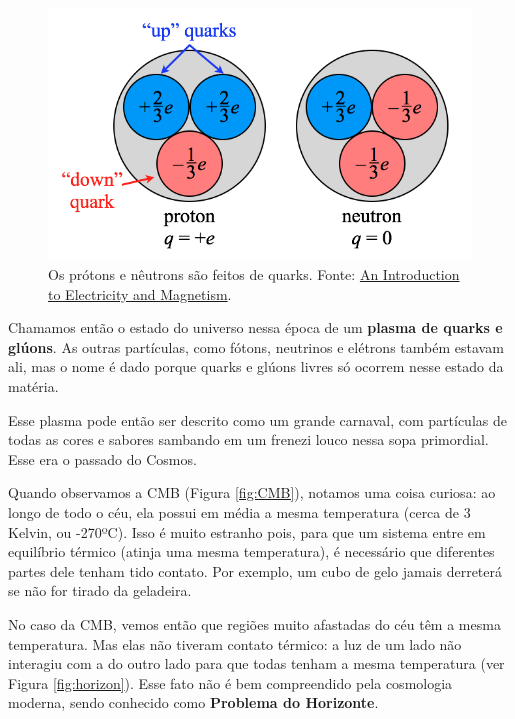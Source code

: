 \begin{multicols}{2}
\begin{figure}[H]
	\centering
	\includegraphics[width=\linewidth]{Figuras/Artigo1/quarks.png}
	\caption{Os prótons e nêutrons são feitos de quarks. Fonte: \href{https://5-volts.blogspot.com/2016/06/carga-eletrica.html}{An Introduction to Electricity and Magnetism}.}
	\label{fig:quarks}
\end{figure}

Chamamos então o estado do universo nessa época de um \textbf{plasma de quarks e glúons}. As outras partículas, como fótons, neutrinos e elétrons também estavam ali, mas o nome é dado porque quarks e glúons livres só ocorrem nesse estado da matéria.

Esse plasma pode então ser descrito como um grande carnaval, com partículas de todas as cores e sabores sambando em um frenezi louco nessa sopa primordial. Esse era o passado do Cosmos.


Quando observamos a CMB (Figura \ref{fig:CMB}), notamos uma coisa curiosa: ao longo de todo o céu, ela possui em média a mesma temperatura (cerca de 3 Kelvin, ou -270ºC). Isso é muito estranho pois, para que um sistema entre em equilíbrio térmico (atinja uma mesma temperatura), é necessário que diferentes partes dele tenham tido contato. Por exemplo, um cubo de gelo jamais derreterá se não for tirado da geladeira.


No caso da CMB, vemos então que regiões muito afastadas do céu têm a mesma temperatura. Mas elas não tiveram contato térmico: a luz de um lado não interagiu com a do outro lado para que todas tenham a mesma temperatura (ver Figura \ref{fig:horizon}). Esse fato não é bem compreendido pela cosmologia moderna, sendo conhecido como \textbf{Problema do Horizonte}.


\end{multicols}

